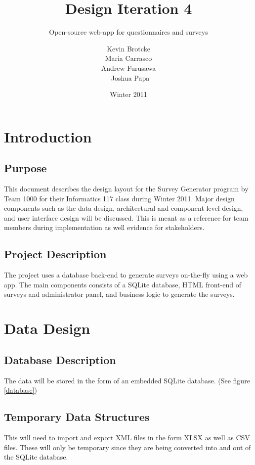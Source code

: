 \documentclass[a4paper,12pt,oneside]{report}
\title{Design Iteration 4}
\subtitle{Open-source web-app for questionnaires and surveys}
\date{Winter 2011}
\author{Kevin Brotcke\\
Maria Carrasco\\
Andrew Furusawa\\\
Joshua Papa }
\begin{document}
   
\renewcommand{\contentsname}{Contents}
\renewcommand{\bibname}{Bibliography}
\renewcommand{\caption}{{\bf Caption : }}

\raskolnikovmaketitle
\tableofcontents

\chapter{Introduction}

\section{ Purpose}

This document describes the design layout for the Survey Generator program by Team 1000 for their Informatics 117 class during Winter 2011. Major design components such as the data design, architectural and component-level design, and user interface design will be discussed. This is meant as a reference for team members during implementation as well evidence for stakeholders.
\section{ Project Description}

        The project uses a database back-end to generate surveys on-the-fly using a web app. The main components consists of a SQLite database, HTML front-end of surveys and administrator panel, and business logic to generate the surveys.
\chapter{ Data Design}
\section{ Database Description}

        The data will be stored in the form of an embedded SQLite database. (See figure \ref{database})
\section{ Temporary Data Structures}

This will need to import and export XML files in the form XLSX as well as CSV files. These will
only be temporary since they are being converted into and out of the SQLite database.
\end{document}
